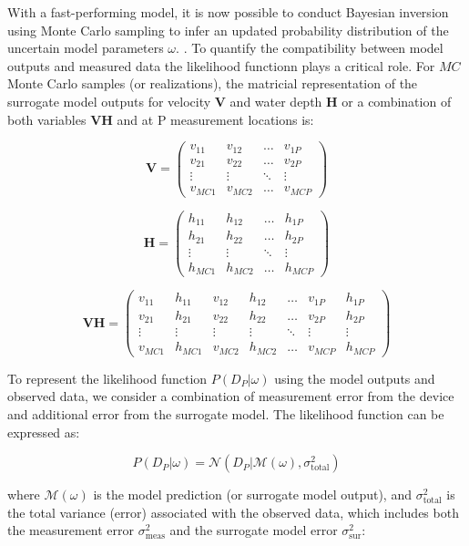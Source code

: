 \documentclass[draft,linenumbers,onecolumn]{agujournal2019} %
\begin{document}
With a fast-performing model, it is now possible to conduct Bayesian inversion using Monte Carlo sampling to infer an updated probability distribution of the uncertain model parameters \(\omega\). \cite{beckers2020bayesian}.  To quantify the compatibility between model outputs and measured data the likelihood functionn plays a critical role.  For \( MC \) Monte Carlo samples (or realizations), the matricial representation of the surrogate model outputs for velocity \( \mathbf{V} \) and water depth \( \mathbf{H} \) or a combination of both variables \( \mathbf{VH} \) and at P measurement locations is:

\[
\mathbf{V} = \begin{pmatrix}
	v_{11} & v_{12} & \dots & v_{1P} \\
	v_{21} & v_{22} & \dots & v_{2P} \\
	\vdots & \vdots & \ddots & \vdots \\
	v_{MC1} & v_{MC2} & \dots & v_{MCP}
\end{pmatrix}
\]

\[
\mathbf{H} = \begin{pmatrix}
	h_{11} & h_{12} & \dots & h_{1P} \\
	h_{21} & h_{22} & \dots & h_{2P} \\
	\vdots & \vdots & \ddots & \vdots \\
	h_{MC1} & h_{MC2} & \dots & h_{MCP}
\end{pmatrix}
\]

\[
\mathbf{VH} = \begin{pmatrix}
	v_{11} & h_{11} & v_{12} & h_{12} & \dots & v_{1P} & h_{1P} \\
	v_{21} & h_{21} & v_{22} & h_{22} & \dots & v_{2P} & h_{2P} \\
	\vdots & \vdots & \vdots & \vdots & \ddots & \vdots & \vdots \\
	v_{MC1} & h_{MC1} & v_{MC2} & h_{MC2} & \dots & v_{MCP} & h_{MCP}
\end{pmatrix}
\]

To represent the likelihood function \( P(D_P | \omega) \) using the model outputs and observed data, we consider a combination of measurement error from the device and additional error from the surrogate model. The likelihood function can be expressed as:

\[
P(D_P | \omega) = \mathcal{N}(D_P | \mathcal{M}(\omega), \sigma_{\text{total}}^2)
\]

where \( \mathcal{M}(\omega) \) is the model prediction (or surrogate model output), and \( \sigma_{\text{total}}^2 \) is the total variance (error) associated with the observed data, which includes both the measurement error \( \sigma_{\text{meas}}^2 \) and the surrogate model error \( \sigma_{\text{sur}}^2 \):
\end{document}
